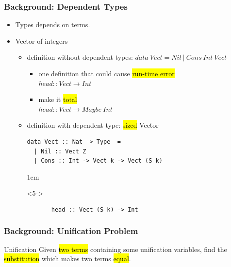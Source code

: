 \documentclass{beamer}
\begin{document}

\begin{frame}[fragile]
  \frametitle{Background: Dependent Types}
  \begin{itemize}
    \item Types depends on terms.
    \item Vector of integers
      \begin{itemize}
        \item definition without dependent types:
          $data ~ Vect = Nil~|~Cons~Int~Vect$
          \begin{itemize}
            \item<2-> one definition that could cause \hl{run-time error}\\
              $head :: Vect \to Int$
            \item<3-> make it \hl{total}\\
              $head :: Vect \to Maybe~Int$
          \end{itemize}
        \item<4-> definition with dependent type: \hl{sized} Vector\\
      \begin{lstlisting}
data Vect :: Nat -> Type  =
  | Nil :: Vect Z
  | Cons :: Int -> Vect k -> Vect (S k)
      \end{lstlisting}
      \begin{overlayarea}{\linewidth}{1cm}
        \begin{onlyenv}<5->
          \begin{lstlisting}
       head :: Vect (S k) -> Int
          \end{lstlisting}
      \end{onlyenv}
      \end{overlayarea}
      \end{itemize}
  \end{itemize}
\end{frame}


\begin{frame}
  \frametitle{Background: Unification Problem}
  \begin{block}{Unification}
  Given \hl{two terms} containing some unification variables,
  find the \hl{substitution}
  which makes two terms \hl{equal}.
  \end{block}


\end{frame}
\end{document}
